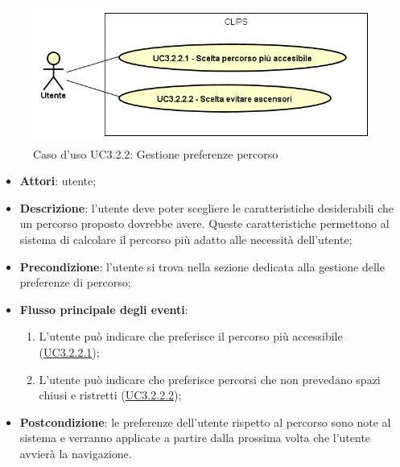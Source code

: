 \documentclass[../AnalisiDeiRequisiti.tex]{subfiles}
\begin{document}
        \begin{figure}[H]
            \centering
            \includegraphics[scale=0.95, width=\textwidth]{img/UC3-2-2.png}
            \caption{Caso d'uso UC3.2.2: Gestione preferenze percorso}\label{fig:UC3.2.2} 
        \end{figure}
\begin{itemize}
\item \textbf{Attori}: utente;
\item \textbf{Descrizione}: l'utente deve poter scegliere le caratteristiche desiderabili che un percorso proposto dovrebbe avere. Queste caratteristiche permettono al sistema di calcolare il percorso più adatto alle necessità dell'utente; 
      \item \textbf{Precondizione}: l'utente si trova nella sezione dedicata alla gestione delle preferenze di percorso;

        \item \textbf{Flusso principale degli eventi}:
          \begin{enumerate}
          \item L'utente può indicare che preferisce il percorso più accessibile (\hyperlink{UC3.2.2.1}{UC3.2.2.1});
          \item L'utente può indicare che preferisce percorsi che non prevedano spazi chiusi e ristretti  (\hyperlink{UC3.2.2.2}{UC3.2.2.2});

      \end{enumerate}
    \item \textbf{Postcondizione}: le preferenze dell'utente rispetto al percorso sono note al sistema e verranno applicate a partire dalla prossima volta che l'utente avvierà la navigazione.
  \end{itemize}
\hypertarget{UC3.2.2.1}{}
\end{document}
